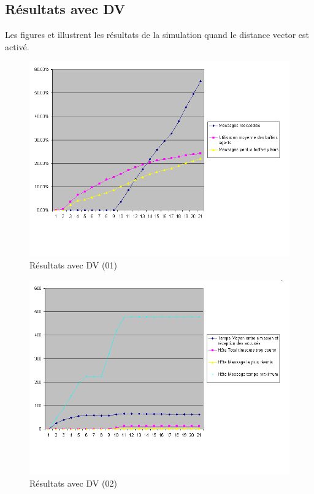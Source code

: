 \documentclass[a4paper,11pt]{article}
\begin{document}
\subsection{Résultats avec DV}
Les figures  et  illustrent les résultats de la simulation quand le distance vector est activé.

\begin{figure}[h!t]
  \centering
    \includegraphics[scale=0.55]{avecdv1}
  \caption{Résultats avec DV (01)}
  \label{fig:avecdv01}
\end{figure}

\begin{figure}[h!t]
  \centering
    \includegraphics[scale=0.55]{avecdv2}
  \caption{Résultats avec DV (02)}
  \label{fig:avecdv02}
\end{figure}










\clearpage


\appendix
\end{document}
